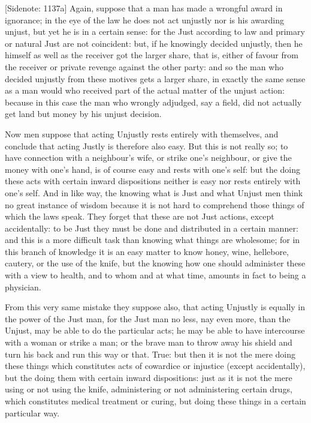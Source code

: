 [Sidenote: 1137a] Again, suppose that a man has made a wrongful award
in ignorance; in the eye of the law he does not act unjustly nor is
his awarding unjust, but yet he is in a certain sense: for the Just
according to law and primary or natural Just are not coincident: but, if
he knowingly decided unjustly, then he himself as well as the receiver
got the larger share, that is, either of favour from the receiver or
private revenge against the other party: and so the man who decided
unjustly from these motives gets a larger share, in exactly the same
sense as a man would who received part of the actual matter of the
unjust action: because in this case the man who wrongly adjudged, say a
field, did not actually get land but money by his unjust decision.

Now men suppose that acting Unjustly rests entirely with themselves,
and conclude that acting Justly is therefore also easy. But this is not
really so; to have connection with a neighbour's wife, or strike one's
neighbour, or give the money with one's hand, is of course easy and
rests with one's self: but the doing these acts with certain inward
dispositions neither is easy nor rests entirely with one's self. And in
like way, the knowing what is Just and what Unjust men think no great
instance of wisdom because it is not hard to comprehend those things
of which the laws speak. They forget that these are not Just actions,
except accidentally: to be Just they must be done and distributed in
a certain manner: and this is a more difficult task than knowing what
things are wholesome; for in this branch of knowledge it is an easy
matter to know honey, wine, hellebore, cautery, or the use of the knife,
but the knowing how one should administer these with a view to health,
and to whom and at what time, amounts in fact to being a physician.

From this very same mistake they suppose also, that acting Unjustly is
equally in the power of the Just man, for the Just man no less, nay even
more, than the Unjust, may be able to do the particular acts; he may be
able to have intercourse with a woman or strike a man; or the brave man
to throw away his shield and turn his back and run this way or that.
True: but then it is not the mere doing these things which constitutes
acts of cowardice or injustice (except accidentally), but the doing them
with certain inward dispositions: just as it is not the mere using or
not using the knife, administering or not administering certain drugs,
which constitutes medical treatment or curing, but doing these things in
a certain particular way.

